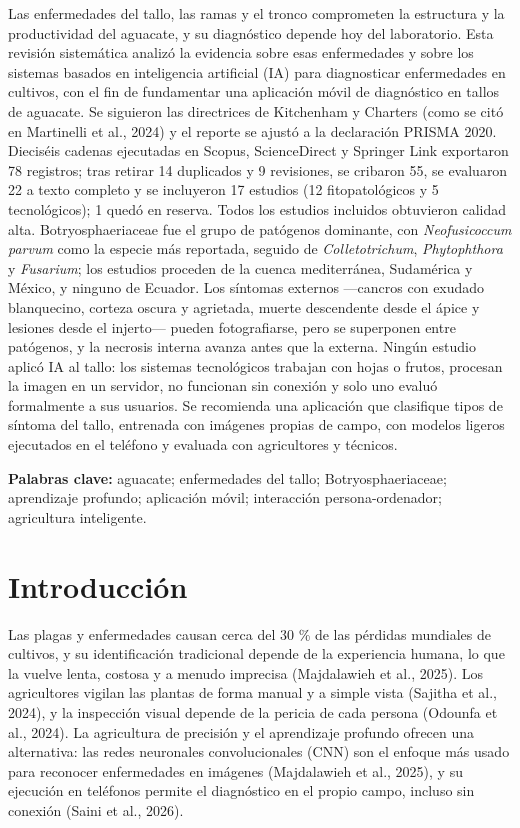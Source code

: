 \documentclass[11pt]{article}
\begin{document}
Las enfermedades del tallo, las ramas y el tronco comprometen la estructura y la productividad del aguacate, y su diagnóstico depende hoy del laboratorio. Esta revisión sistemática analizó la evidencia sobre esas enfermedades y sobre los sistemas basados en inteligencia artificial (IA) para diagnosticar enfermedades en cultivos, con el fin de fundamentar una aplicación móvil de diagnóstico en tallos de aguacate. Se siguieron las directrices de Kitchenham y Charters (como se citó en Martinelli et al., 2024) y el reporte se ajustó a la declaración PRISMA 2020. Dieciséis cadenas ejecutadas en Scopus, ScienceDirect y Springer Link exportaron 78 registros; tras retirar 14 duplicados y 9 revisiones, se cribaron 55, se evaluaron 22 a texto completo y se incluyeron 17 estudios (12 fitopatológicos y 5 tecnológicos); 1 quedó en reserva. Todos los estudios incluidos obtuvieron calidad alta. Botryosphaeriaceae fue el grupo de patógenos dominante, con \textit{Neofusicoccum parvum} como la especie más reportada, seguido de \textit{Colletotrichum}, \textit{Phytophthora} y \textit{Fusarium}; los estudios proceden de la cuenca mediterránea, Sudamérica y México, y ninguno de Ecuador. Los síntomas externos —cancros con exudado blanquecino, corteza oscura y agrietada, muerte descendente desde el ápice y lesiones desde el injerto— pueden fotografiarse, pero se superponen entre patógenos, y la necrosis interna avanza antes que la externa. Ningún estudio aplicó IA al tallo: los sistemas tecnológicos trabajan con hojas o frutos, procesan la imagen en un servidor, no funcionan sin conexión y solo uno evaluó formalmente a sus usuarios. Se recomienda una aplicación que clasifique tipos de síntoma del tallo, entrenada con imágenes propias de campo, con modelos ligeros ejecutados en el teléfono y evaluada con agricultores y técnicos.

\textbf{Palabras clave:} aguacate; enfermedades del tallo; Botryosphaeriaceae; aprendizaje profundo; aplicación móvil; interacción persona-ordenador; agricultura inteligente.

\section{Introducción}

Las plagas y enfermedades causan cerca del 30 \% de las pérdidas mundiales de cultivos, y su identificación tradicional depende de la experiencia humana, lo que la vuelve lenta, costosa y a menudo imprecisa (Majdalawieh et al., 2025). Los agricultores vigilan las plantas de forma manual y a simple vista (Sajitha et al., 2024), y la inspección visual depende de la pericia de cada persona (Odounfa et al., 2024). La agricultura de precisión y el aprendizaje profundo ofrecen una alternativa: las redes neuronales convolucionales (CNN) son el enfoque más usado para reconocer enfermedades en imágenes (Majdalawieh et al., 2025), y su ejecución en teléfonos permite el diagnóstico en el propio campo, incluso sin conexión (Saini et al., 2026).
\end{document}
